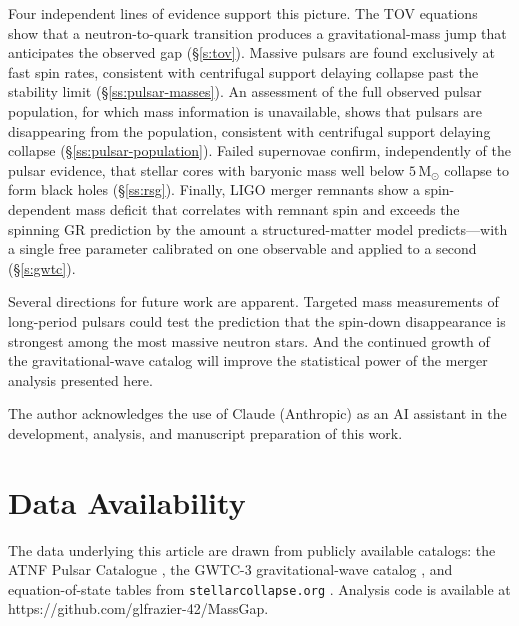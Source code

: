 \documentclass[manuscript,linenumbers]{aastex701}
\newcommand{\bib}{mass_gap.bib}
\newcommand{\Msun}{\mathrm{M}_\odot}
\begin{document}
Four independent lines of evidence support this picture.  The TOV
equations show that a neutron-to-quark transition produces a
gravitational-mass jump that anticipates the observed gap
(\S\ref{s:tov}).  Massive pulsars are found exclusively at fast spin
rates, consistent with centrifugal support delaying collapse past the
stability limit (\S\ref{ss:pulsar-masses}).  An assessment of the full
observed pulsar population, for which mass information is unavailable,
shows that pulsars are disappearing from the population, consistent
with centrifugal support delaying collapse
(\S\ref{ss:pulsar-population}).  Failed supernovae confirm,
independently of the pulsar evidence, that stellar cores with baryonic
mass well below $5\,\Msun$ collapse to form black holes
(\S\ref{ss:rsg}).  Finally, LIGO merger remnants show a spin-dependent
mass deficit that correlates with remnant spin and exceeds the
spinning GR prediction by the amount a structured-matter model
predicts---with a single free parameter calibrated on one observable
and applied to a second (\S\ref{s:gwtc}).

Several directions for future work are apparent.  Targeted mass
measurements of long-period pulsars could test the prediction that the
spin-down disappearance is strongest among the most massive neutron
stars.  And the continued growth of the gravitational-wave catalog will
improve the statistical power of the merger analysis presented here.

\begin{acknowledgments}
The author acknowledges the use of Claude (Anthropic) as an AI
assistant in the development, analysis, and manuscript preparation of
this work.
\end{acknowledgments}

\section*{Data Availability}

The data underlying this article are drawn from publicly available
catalogs: the ATNF Pulsar Catalogue \citep{Manchester2005}, the
GWTC-3 gravitational-wave catalog \citep{GWTC3,GWOSC2023}, and
equation-of-state tables from \texttt{stellarcollapse.org}
\citep{OConnorOtt2010}. Analysis code is available at
https://github.com/glfrazier-42/MassGap.



\end{document}
